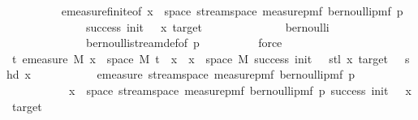 \begin{isabellebody}
\ \ \ \ \ \ \ \ \isamarkupfalse%
\ emeasure{\isacharunderscore}{\kern0pt}finite{\isacharbrackleft}{\kern0pt}of\ {\isachardoublequoteopen}{\isacharbraceleft}{\kern0pt}x\ {\isasymin}\ space\ {\isacharparenleft}{\kern0pt}stream{\isacharunderscore}{\kern0pt}space\ {\isacharparenleft}{\kern0pt}measure{\isacharunderscore}{\kern0pt}pmf\ {\isacharparenleft}{\kern0pt}bernoulli{\isacharunderscore}{\kern0pt}pmf\ p{\isacharparenright}{\kern0pt}{\isacharparenright}{\kern0pt}{\isacharparenright}{\kern0pt}{\isachardot}{\kern0pt}\isanewline
\ \ \ \ \ \ \ \ \ \ \ \ \ \ success\ {\isacharparenleft}{\kern0pt}init\ {\isacharminus}{\kern0pt}\ {}{\isacharparenright}{\kern0pt}\ x\ target{\isacharbraceright}{\kern0pt}{\isachardoublequoteclose}{\isacharbrackright}{\kern0pt}\isanewline
\ \ \ \ \ \ \ \ \ \ \ \ \ \ bernoulli\isanewline
\ \ \ \ \ \ \ \ \ \ \ \ \ \ bernoulli{\isacharunderscore}{\kern0pt}stream{\isacharunderscore}{\kern0pt}def{\isacharbrackleft}{\kern0pt}of\ p{\isacharbrackright}{\kern0pt}\isanewline
\ \ \ \ \ \ \ \ \isamarkupfalse%
\ force\isanewline
\ \ \ \ \ \ \isamarkupfalse%
\ \isamarkupfalse%
\ {\isachardoublequoteopen}{\isacharparenleft}{\kern0pt}{\isasymAnd}t{\isachardot}{\kern0pt}\ emeasure\ M\ {\isacharbraceleft}{\kern0pt}x\ {\isasymin}\ space\ M{\isachardot}{\kern0pt}\ t\ {\isacharhash}{\kern0pt}{\isacharhash}{\kern0pt}\ x\ {\isasymin}\ {\isacharbraceleft}{\kern0pt}x\ {\isasymin}\ space\ M{\isachardot}{\kern0pt}\ success\ {\isacharparenleft}{\kern0pt}init\ {\isacharminus}{\kern0pt}\ {}{\isacharparenright}{\kern0pt}\ {\isacharparenleft}{\kern0pt}stl\ x{\isacharparenright}{\kern0pt}\ target\ {\isasymand}\ {\isasymnot}\ shd\ x{\isacharbraceright}{\kern0pt}{\isacharbraceright}{\kern0pt}\ {\isacharequal}{\kern0pt}\isanewline
\ \ \ \ \ \ \ \ \ \ emeasure\ {\isacharparenleft}{\kern0pt}stream{\isacharunderscore}{\kern0pt}space\ {\isacharparenleft}{\kern0pt}measure{\isacharunderscore}{\kern0pt}pmf\ {\isacharparenleft}{\kern0pt}bernoulli{\isacharunderscore}{\kern0pt}pmf\ p{\isacharparenright}{\kern0pt}{\isacharparenright}{\kern0pt}{\isacharparenright}{\kern0pt}\isanewline
\ \ \ \ \ \ \ \ \ \ \ {\isacharbraceleft}{\kern0pt}x\ {\isasymin}\ space\ {\isacharparenleft}{\kern0pt}stream{\isacharunderscore}{\kern0pt}space\ {\isacharparenleft}{\kern0pt}measure{\isacharunderscore}{\kern0pt}pmf\ {\isacharparenleft}{\kern0pt}bernoulli{\isacharunderscore}{\kern0pt}pmf\ p{\isacharparenright}{\kern0pt}{\isacharparenright}{\kern0pt}{\isacharparenright}{\kern0pt}{\isachardot}{\kern0pt}\ success\ {\isacharparenleft}{\kern0pt}init\ {\isacharminus}{\kern0pt}\ {}{\isacharparenright}{\kern0pt}\ x\ target{\isacharbraceright}{\kern0pt}\ {\isacharasterisk}{\kern0pt}\isanewline

\end{isabellebody}
